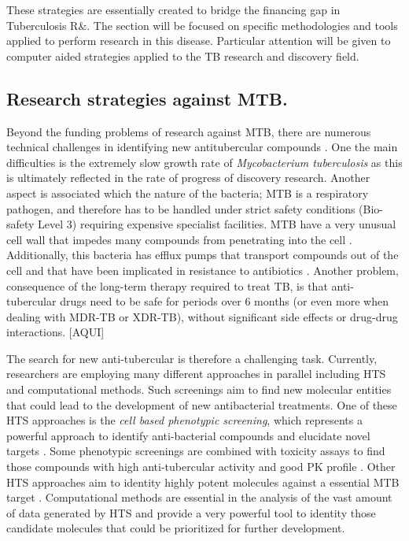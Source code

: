 \documentclass[12pt, a4paper,twoside]{tesi_upf}
\begin{document}
\par These strategies are essentially created to bridge the financing gap in Tuberculosis R$\&$. The section will be focused on specific methodologies and tools applied to perform research in this disease. Particular attention will be given to computer aided strategies applied to the TB research and discovery field. 

\subsection{Research strategies against MTB.}\label{mtb_research}

\par Beyond the funding problems of research against MTB, there are numerous technical challenges in identifying new antitubercular compounds \cite{Zuniga2015}. One the main difficulties is the extremely slow growth rate of \textit{Mycobacterium tuberculosis} as this is ultimately reflected in the rate of progress of discovery research. Another aspect is associated which the nature of the bacteria; MTB is a respiratory pathogen, and therefore has to be handled under strict safety conditions (Bio-safety Level 3) requiring expensive specialist facilities. MTB have a very unusual cell wall that impedes many compounds from penetrating into the cell \cite{Brennan2003}. Additionally, this bacteria has efflux pumps that transport compounds out of the cell and that have been implicated in resistance to antibiotics \cite{Rodrigues2012}. Another problem, consequence of the long-term therapy required to treat TB, is that anti-tubercular drugs need to be safe for periods over 6 months (or even more when dealing with MDR-TB or XDR-TB), without significant side effects or drug-drug interactions. [AQUI]
\par The search for new anti-tubercular is therefore a challenging task. Currently, researchers are employing many different approaches in parallel including HTS and computational methods. Such screenings aim to find new molecular entities that could lead to the development of new antibacterial treatments. One of these HTS approaches is the \textit{cell based phenotypic screening}, which represents a powerful approach to identify anti-bacterial compounds and elucidate novel targets \cite{Manjunatha2015}. Some phenotypic screenings are combined with toxicity assays to find those compounds with high anti-tubercular activity and good PK profile \cite{Ballell2013}. Other HTS approaches aim to identity highly potent molecules against a essential MTB target \cite{Park2015, Arora2014}.  Computational methods are essential in the analysis of the vast amount of data generated by HTS and provide a very powerful tool to identity those candidate molecules that could be prioritized for further development. 
\end{document}
